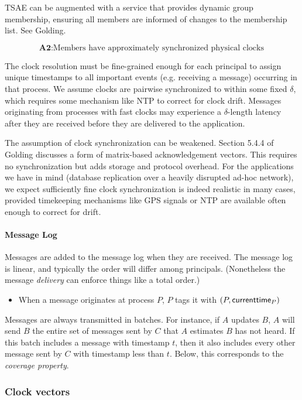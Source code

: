 \documentclass[]             %
{NASA}                       %
\theoremstyle{definition}
\begin{document}
TSAE can be augmented with a service that provides dynamic group
membership, ensuring all members are informed of changes to the
membership list. See Golding.

\[
  \textbf{A2}: \textrm{Members have approximately synchronized physical clocks}
\]

The clock resolution must be fine-grained enough for each principal to
assign unique timestamps to all important events (e.g. receiving a
message) occurring in that process. We assume clocks are pairwise
synchronized to within some fixed $\delta$, which requires some
mechanism like NTP to correct for clock drift. Messages originating
from processes with fast clocks may experience a $\delta$-length
latency after they are received before they are delivered to the
application.

The assumption of clock synchronization can be weakened. Section 5.4.4
of Golding \citationneeded discusses a form of matrix-based
acknowledgement vectors. This requires no synchronization but adds
storage and protocol overhead. For the applications we have in mind
(database replication over a heavily disrupted ad-hoc network), we
expect sufficiently fine clock synchronization is indeed realistic in
many cases, provided timekeeping mechanisms like GPS signals or NTP
are available often enough to correct for drift.

\paragraph{Message Log}

Messages are added to the message log when they are received. The
message log is linear, and typically the order will differ among
principals. (Nonetheless the message \emph{delivery} can enforce
things like a total order.)

\begin{itemize}
\item When a message originates at process $P$, $P$ tags it with $(P, \textsf{currenttime}_{P})$
\end{itemize}

Messages are always transmitted in batches. For instance, if $A$
updates $B$, $A$ will send $B$ the entire set of messages sent by $C$
that $A$ estimates $B$ has not heard. If this batch includes a message
with timestamp $t$, then it also includes every other message sent by
$C$ with timestamp less than $t$. Below, this corresponds to the
\emph{coverage property}.

\subsubsection{Clock vectors}
\end{document}
